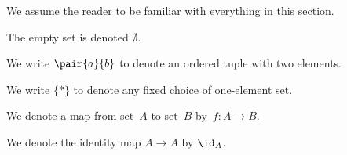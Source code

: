 \label{sec:notn_and_background}


We assume the reader to be familiar with everything in this section.

The empty set is denoted $\emptyset$.

We write $\pair{a}{b}$ to denote an ordered tuple with two elements.

We write $\{*\}$ to denote any fixed choice of one-element set.

We denote a map from set~$A$ to set~$B$ by~$f\colon A\to B$.

We denote the identity map $A\to A$ by $\id_A$.
 




